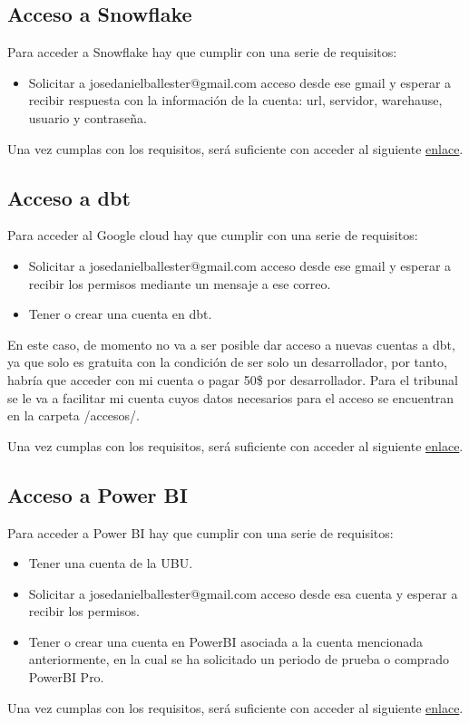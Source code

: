 \subsection{Acceso a Snowflake}
Para acceder a Snowflake hay que cumplir con una serie de requisitos:
\begin{itemize}
    \item Solicitar a josedanielballester@gmail.com acceso desde ese gmail y esperar a recibir respuesta con la información de la cuenta: url, servidor, warehause, usuario y contraseña.
\end{itemize}
Una vez cumplas con los requisitos, será suficiente con acceder al siguiente \href{https://app.snowflake.com/switzerland-north.azure/sh96129/data/databases}{enlace}.
\subsection{Acceso a dbt}
Para acceder al Google cloud hay que cumplir con una serie de requisitos:
\begin{itemize}
    \item Solicitar a josedanielballester@gmail.com acceso desde ese gmail y esperar a recibir los permisos mediante un mensaje a ese correo.
    \item Tener o crear una cuenta en dbt.
\end{itemize}
En este caso, de momento no va a ser posible dar acceso a nuevas cuentas a dbt, ya que solo es gratuita con la condición de ser solo un desarrollador, por tanto, habría que acceder con mi cuenta o pagar 50\$ por desarrollador. Para el tribunal se le va a facilitar mi cuenta cuyos datos necesarios para el acceso se encuentran en la carpeta /accesos/.

Una vez cumplas con los requisitos, será suficiente con acceder al siguiente \href{https://cloud.getdbt.com/login/}{enlace}.

\subsection{Acceso a Power BI}
Para acceder a Power BI hay que cumplir con una serie de requisitos:
\begin{itemize}
    \item Tener una cuenta de la UBU.
    \item Solicitar a josedanielballester@gmail.com acceso desde esa cuenta y esperar a recibir los permisos.
    \item Tener o crear una cuenta en PowerBI asociada a la cuenta mencionada anteriormente,  en la cual se ha solicitado un periodo de prueba o comprado PowerBI Pro.
\end{itemize}
Una vez cumplas con los requisitos, será suficiente con acceder al siguiente \href{https://app.powerbi.com/groups/dcd777d5-2142-451a-b14e-52601f1b925d/list}{enlace}.

